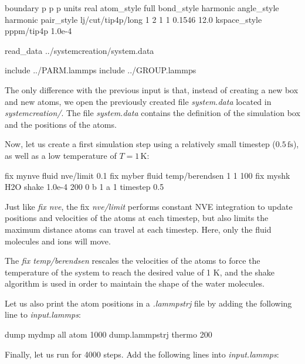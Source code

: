 \begin{lcverbatim}
boundary p p p
units real
atom_style full
bond_style harmonic
angle_style harmonic
pair_style lj/cut/tip4p/long 1 2 1 1 0.1546 12.0
kspace_style pppm/tip4p 1.0e-4

read_data ../systemcreation/system.data

include ../PARM.lammps
include ../GROUP.lammps
\end{lcverbatim}

\noindent The only difference with the previous input is that, instead
of creating a new box and new atoms, we open the
previously created file \textit{system.data} located in \textit{systemcreation/}.
The file \textit{system.data} contains the definition of the simulation box
and the positions of the atoms.

\vspace{0.25cm} \noindent Now, let us create a first simulation step using a relatively small 
timestep ($0.5\,\text{fs}$), as well as a low temperature
of $T = 1\,\text{K}$:

\begin{lcverbatim}
fix mynve fluid nve/limit 0.1
fix myber fluid temp/berendsen 1 1 100
fix myshk H2O shake 1.0e-4 200 0 b 1 a 1
timestep 0.5
\end{lcverbatim}

\noindent Just like \textit{fix nve}, the fix \textit{nve/limit} performs constant NVE integration to
update positions and velocities of the atoms at each
timestep, but also limits the maximum distance atoms can travel at
each timestep. Here, only the fluid molecules and ions will move.

\vspace{0.25cm} \noindent The \textit{fix temp/berendsen} rescales the
velocities of the atoms to force the temperature of the system
to reach the desired value of 1 K, and the shake algorithm
is used in order to maintain the shape of the water molecules.

\vspace{0.25cm} \noindent Let us also print the atom positions in a \textit{.lammpstrj} file by
adding the following line to \textit{input.lammps}:

\begin{lcverbatim}
dump mydmp all atom 1000 dump.lammpstrj
thermo 200
\end{lcverbatim}

\noindent Finally, let us run for 4000 steps. Add the 
following lines into \textit{input.lammps}:

